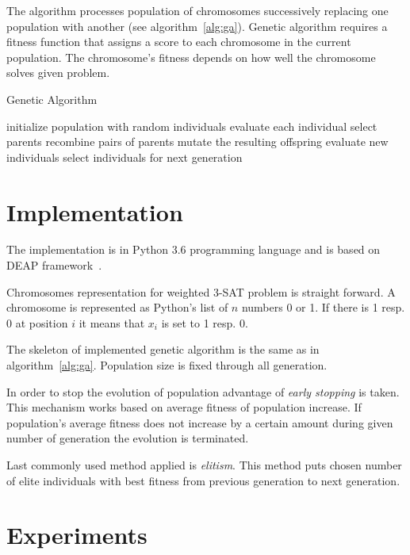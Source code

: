 \documentclass{article}
\begin{document}
The algorithm processes population of chromosomes successively replacing
one population with another (see algorithm~\ref{alg:ga}).
Genetic algorithm requires a fitness function that assigns a score to
each chromosome in the current population.
The chromosome's fitness depends on how well the chromosome solves given
problem.
\cite{mitchell1996}

\begin{algorithm}[hb]
\caption{Genetic Algorithm~\cite{eiben2003}}
\label{alg:ga}
\begin{algorithmic}
\STATE initialize population with random individuals
\STATE evaluate each individual
\STATE select parents
\STATE recombine pairs of parents
\STATE mutate the resulting offspring
\STATE evaluate new individuals
\STATE select individuals for next generation
\ENDWHILE
\end{algorithmic}
\end{algorithm}

\section{Implementation}

The implementation is in Python 3.6 programming language
and is based on DEAP framework~\cite{fortin2012}.

Chromosomes representation for weighted 3-SAT problem is straight forward.
A chromosome is represented as Python's list of $n$ numbers 0 or 1.
If there is 1 resp. 0 at position $i$ it means that $x_i$ is set to 1 resp. 0.

The skeleton of implemented genetic algorithm is the same as
in algorithm~\ref{alg:ga}.
Population size is fixed through all generation.

In order to stop the evolution of population advantage of
\textit{early stopping} is taken.
This mechanism works based on average fitness of population increase.
If population's average fitness does not increase by a certain amount
during given number of generation the evolution is terminated.

Last commonly used method applied is \textit{elitism}.
This method puts chosen number of elite individuals with best fitness
from previous generation to next generation.

\section{Experiments}
\end{document}
